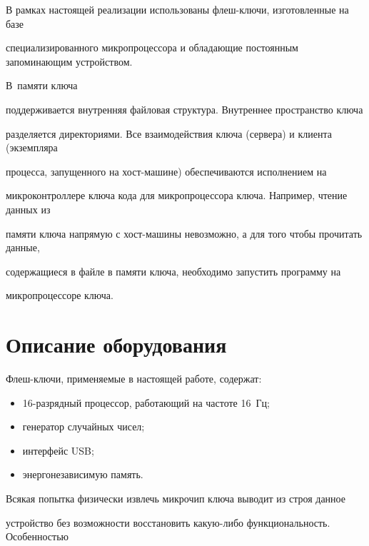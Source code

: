     В рамках настоящей реализации использованы флеш-клю\-чи, изготовленные на базе 


специализированного микропроцессора и обладающие постоянным запоминающим устройством. 


В~памяти ключа 


поддерживается внутренняя файловая структура. Внутреннее пространство ключа 


разделяется директориями. Все взаимодействия ключа (сервера) и клиента (экземпляра 


процесса, запущенного на хост-ма\-ши\-не) обеспечиваются исполнением на 


микроконтроллере ключа кода для микропроцессора ключа. Например, чтение данных из 


памяти ключа напрямую с хост-ма\-ши\-ны невозможно, а для того чтобы прочитать данные, 


содержащиеся в файле в памяти ключа, необходимо запустить программу на 


микропроцессоре ключа.





\section{Описание оборудования}





   Флеш-ключи, применяемые в настоящей работе, содержат:


   \begin{itemize}


\item 16-разрядный процессор, работающий на частоте 16~Гц;


\item генератор случайных чисел;


\item интерфейс USB;


\item энергонезависимую память.


\end{itemize}





   Всякая попытка физически     извлечь микрочип ключа выводит из строя данное 


устройство без возможности восстановить какую-либо функциональность. Особенностью 


